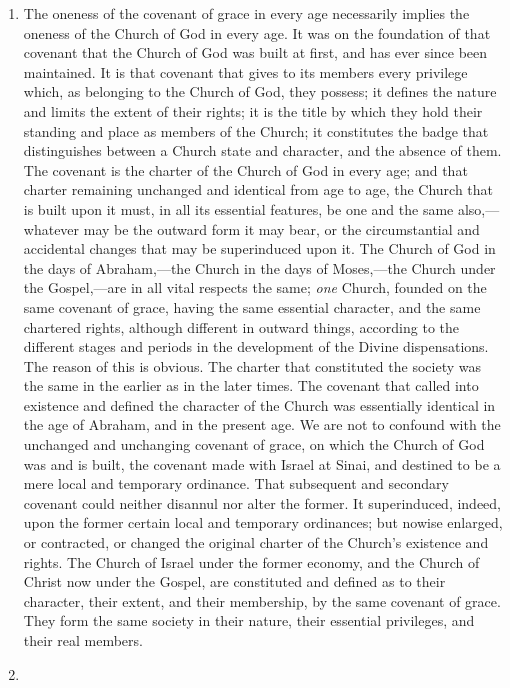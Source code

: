 \documentclass[
]{book}
\begin{document}
\begin{enumerate}
\def\labelenumi{\arabic{enumi}.}
\item
  The oneness of the covenant of grace in every age necessarily implies the oneness of the Church of God in every age. It was on the foundation of that covenant that the Church of God was built at first, and has ever since been maintained. It is that covenant that gives to its members every privilege which, as belonging to the Church of God, they possess; it defines the nature and limits the extent of their rights; it is the title by which they hold their standing and place as members of the Church; it constitutes the badge that distinguishes between a Church state and character, and the absence of them. The covenant is the charter of the Church of God in every age; and that charter remaining unchanged and identical from age to age, the Church that is built upon it must, in all its essential features, be one and the same also,---whatever may be the outward form it may bear, or the circumstantial and accidental changes that may be superinduced upon it. The Church of God in the days of Abraham,---the Church in the days of Moses,---the Church under the Gospel,---are in all vital respects the same; \emph{one} Church, founded on the same covenant of grace, having the same essential character, and the same chartered rights, although different in outward things, according to the different stages and periods in the development of the Divine dispensations. The reason of this is obvious. The charter that constituted the society was the same in the earlier as in the later times. The covenant that called into existence and defined the character of the Church was essentially identical in the age of Abraham, and in the present age. We are not to confound with the unchanged and unchanging covenant of grace, on which the Church of God was and is built, the covenant made with Israel at Sinai, and destined to be a mere local and temporary ordinance. That subsequent and secondary covenant could neither disannul nor alter the former. It superinduced, indeed, upon the former certain local and temporary ordinances; but nowise enlarged, or contracted, or changed the original charter of the Church's existence and rights. The Church of Israel under the former economy, and the Church of Christ now under the Gospel, are constituted and defined as to their character, their extent, and their membership, by the same covenant of grace. They form the same society in their nature, their essential privileges, and their real members.
\item

\end{enumerate}
\end{document}
